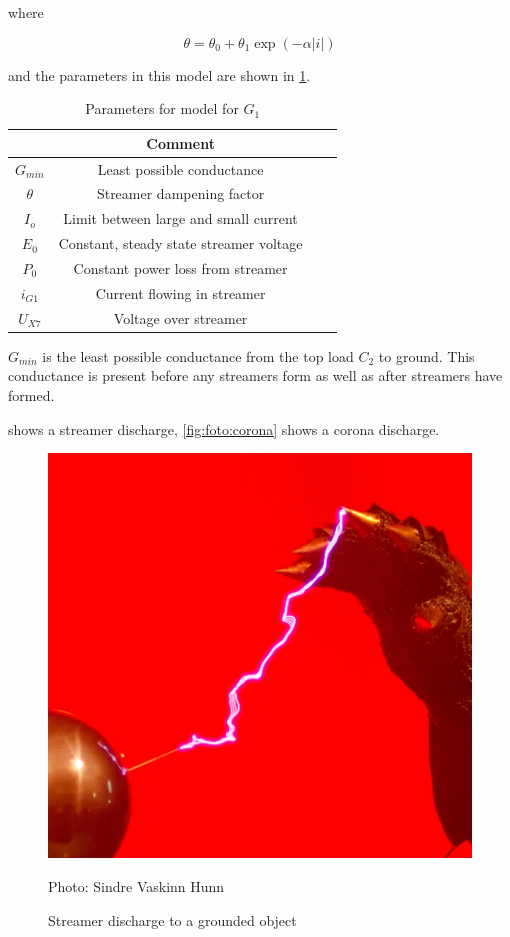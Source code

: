 where

\begin{equation}
    \theta = \theta_0 + \theta_1 \exp(-\alpha |i|)
\end{equation}

and the parameters in this model are shown in \cref{tab:g1params}.

\begin{table}[H]
    \centering
    \begin{tabular}{c|c|c|c}
         & Comment &  &\\ \hline
        $G_{min}$ & Least possible conductance &  &\\
        $\theta$  & Streamer dampening factor &  &\\
        $I_o$     & Limit between large and small current &  &\\
        $E_0$     & Constant, steady state streamer voltage &  &\\
        $P_0$     & Constant power loss from streamer &  & \\
        $i_{G1}$  & Current flowing in streamer      &  & \\
        $U_{X7}$     & Voltage over streamer            &  &
    \end{tabular}
    \caption{Parameters for model for $G_1$}
    \label{tab:g1params}
\end{table}

$G_{min}$ is the least possible conductance from the top load $C_2$ to ground. This conductance is present before any streamers form as well as after streamers have formed.

\newpage
{} shows a streamer discharge, \cref{fig:foto:corona} shows a corona discharge.

\begin{figure}[H]
    \centering
    \includegraphics[height=0.4\textheight]{img/foto/Streamer.jpg}
    \caption{Streamer discharge to a grounded object}
    Photo: Sindre Vaskinn Hunn
    \label{fig:foto:streamer}
\end{figure}

